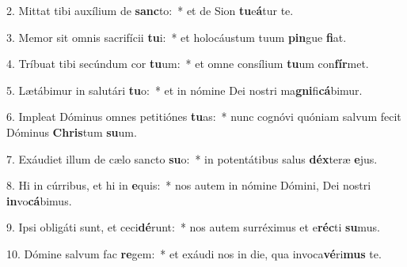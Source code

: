 2. Mittat tibi auxílium de \textbf{sanc}to:~*  et de Sion \textbf{tu}e\textbf{á}tur te.\

3. Memor sit omnis sacrifícii \textbf{tu}i:~*  et holocáustum tuum \textbf{pin}gue \textbf{fi}at.\

4. Tríbuat tibi secúndum cor \textbf{tu}um:~*  et omne consílium \textbf{tu}um con\textbf{fír}met.\

5. Lætábimur in salutári \textbf{tu}o:~*  et in nómine Dei nostri ma\textbf{gni}fi\textbf{cá}bimur.\

6. Impleat Dóminus omnes petitiónes \textbf{tu}as:~*  nunc cognóvi quóniam salvum fecit Dóminus \textbf{Chris}tum \textbf{su}um.\

7. Exáudiet illum de cælo sancto \textbf{su}o:~*  in potentátibus salus \textbf{déx}teræ \textbf{e}jus.\

8. Hi in cúrribus, et hi in \textbf{e}quis:~*  nos autem in nómine Dómini, Dei nostri \textbf{in}vo\textbf{cá}bimus.\

9. Ipsi obligáti sunt, et ceci\textbf{dé}runt:~*  nos autem surréximus et e\textbf{réc}ti \textbf{su}mus.\

10. Dómine salvum fac \textbf{re}gem:~*  et exáudi nos in die, qua invoca\textbf{vé}ri\textbf{mus} te.\

